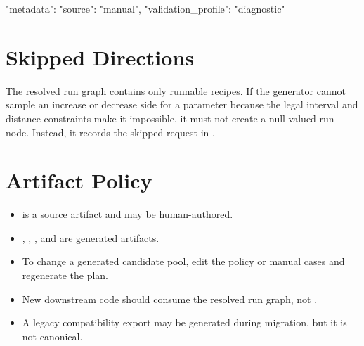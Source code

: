 \documentclass[11pt]{article}
\begin{document}
\begin{DocCode}
"metadata": {
  "source": "manual",
  "validation_profile": "diagnostic"
}
\end{DocCode}

\section*{Skipped Directions}

The resolved run graph contains only runnable recipes.
If the generator cannot sample an increase or decrease side for a parameter because the legal interval and distance constraints make it impossible, it must not create a null-valued run node.
Instead, it records the skipped request in .

\section*{Artifact Policy}

\begin{itemize}
\item {} is a source artifact and may be human-authored.
\item {}, , , and  are generated artifacts.
\item To change a generated candidate pool, edit the policy or manual cases and regenerate the plan.
\item New downstream code should consume the resolved run graph, not .
\item A legacy  compatibility export may be generated during migration, but it is not canonical.
\end{itemize}
\end{document}
